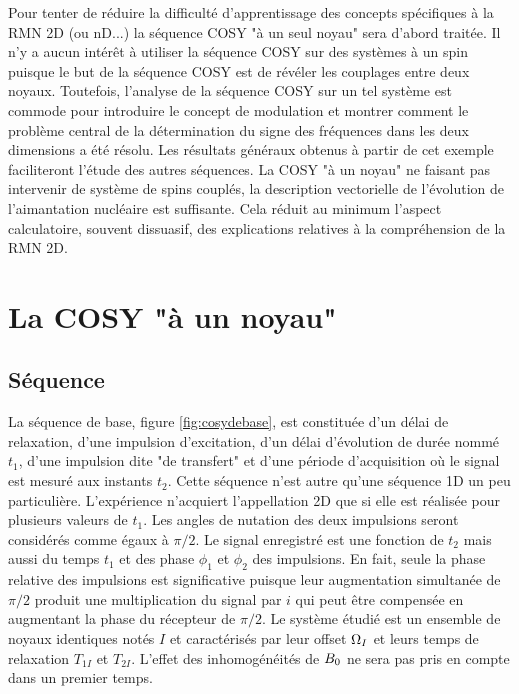 Pour tenter de réduire la difficulté d'apprentissage 
des concepts spécifiques à la RMN 2D (ou nD...) la séquence COSY
"à un seul noyau" sera d'abord traitée.
Il n'y a aucun intérêt à utiliser la séquence COSY sur des systèmes à un spin
puisque le but de la séquence COSY
est de révéler les couplages entre deux noyaux.
Toutefois, l'analyse de la séquence COSY sur un tel système
est commode pour introduire le concept de modulation et montrer
comment le problème central de la détermination du signe des fréquences dans
les deux dimensions a été résolu.
Les résultats généraux obtenus à partir de cet exemple
faciliteront l'étude des autres séquences.
La COSY "à un noyau" ne faisant pas intervenir de système de spins couplés,
la description vectorielle de l'évolution de l'aimantation nucléaire est suffisante.
Cela réduit au minimum l'aspect calculatoire, souvent dissuasif, des explications
relatives à la compréhension de la RMN 2D.

\section{La COSY "à un noyau"}
\label{sec:2d:cosy1noyau}
\subsection{Séquence}
\label{sec:2d:cosy1noyau:seq}
La séquence de base, figure \ref{fig:cosydebase}, est constituée d'un délai de relaxation,
d'une impulsion d'excitation, d'un délai d'évolution de durée nommé $t_1$, 
d'une impulsion dite "de transfert" et d'une période
d'acquisition où le signal est mesuré aux instants $t_2$.
Cette séquence n'est autre qu'une séquence 1D un peu particulière.
L'expérience n'acquiert l'appellation 2D que si elle est réalisée pour plusieurs valeurs
de $t_1$.
Les angles de nutation des deux impulsions seront considérés comme égaux à $\pi/2$.
Le signal enregistré est une fonction de $t_2$  mais aussi du temps 
$t_1$ et des phase $\phi_1$ et $\phi_2$ des impulsions.
En fait, seule la phase relative des impulsions est significative puisque leur augmentation
simultanée de $\pi/2$ produit une multiplication du signal par $i$
qui peut être compensée en augmentant la phase du récepteur de $\pi/2$.
Le système étudié est un ensemble de noyaux identiques notés
$I$ et caractérisés par leur offset $\Omega_I$
et leurs temps de relaxation $T_{1I}$ et $T_{2I}$.
L'effet des inhomogénéités de $B_0$ ne sera pas pris en compte dans un premier temps.

